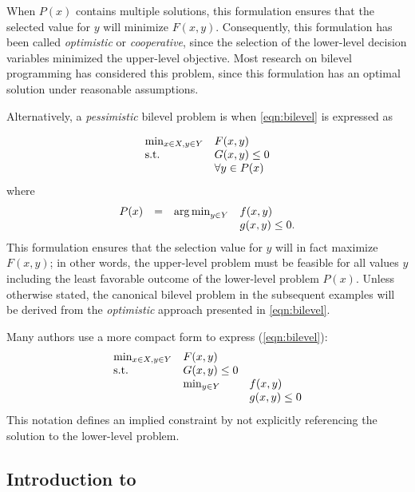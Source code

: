 When $P(x)$ contains multiple solutions, this formulation ensures
that the selected value for $y$ will minimize $F(x,y)$.  Consequently,
this formulation has been called \textit{optimistic} or
\textit{cooperative}, since the selection of the lower-level decision
variables minimized the upper-level objective.  Most research on
bilevel programming has considered this problem, since this formulation
has an optimal solution under reasonable assumptions.

Alternatively, a \textit{pessimistic} bilevel problem is when \eqref{eqn:bilevel} is expressed as 

\begin{equation}
\label{eqn:bilevel_pess}
\begin{array}{ll}
\min_{x \in X, y \in Y}   & F(x,y)\\
\textrm{s.t.}                 & G(x,y) \leq 0\\
                    & \forall y \in P(x)
\end{array}
\end{equation}
where 
\[
\begin{array}{llll}
P(x) & = & \operatorname*{arg\,min}_{y \in Y}    & f(x,y)\\
 & &                            & g(x,y) \leq 0.
\end{array}
\]
This formulation ensures that the selection value for $y$ will in fact maximize $F(x,y)$; in other words, the upper-level problem must be feasible for all values $y$ including the least favorable outcome of the lower-level problem $P(x)$. Unless otherwise stated, the canonical bilevel problem in the subsequent examples will be derived from the \textit{optimistic} approach presented in \eqref{eqn:bilevel}.


Many authors use a more compact form to express (\ref{eqn:bilevel}):
\begin{equation}
\label{eqn:bilevel-compact}
\begin{array}{lll}
\min_{x \in X, y \in Y}   & F(x,y) & \\
\textrm{s.t.}                       & G(x,y) \leq 0 & \\
                          & \min_{y \in Y}    & f(x,y)\\
                          &                   & g(x,y) \leq 0
\end{array}
\end{equation}
This notation defines an implied constraint by not explicitly referencing the solution to the lower-level problem.

\subsection{Introduction to }

